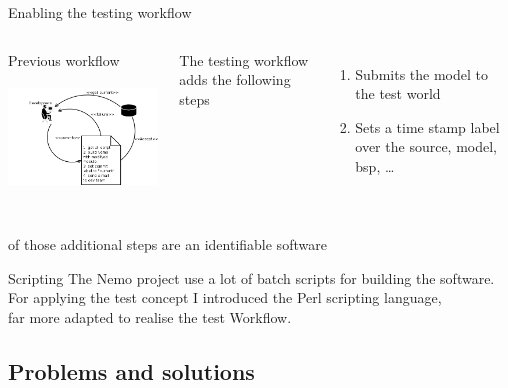 \documentclass{beamer}
\begin{document}
\begin{frame}{Enabling the testing workflow}
  \begin{columns}

    \begin{block}{Previous workflow}
      \includegraphics[height=3.5cm]{img/workflow.png}
    \end{block}

    The testing workflow adds the following steps
    \begin{enumerate}
    \item<1-> Submits the model to the test world
    \item<2-> Sets a time stamp label over the source, model, bsp, \ldots
    \end{enumerate}
  \end{columns}
\begin{description}
 \item<3->[The results] of those additional steps are an identifiable software
\end{description}
\end{frame}

\begin{frame}{Scripting}
The Nemo project use a lot of batch scripts for building the software.\\
For applying the test concept I introduced the \alert{Perl} scripting language,\\
far more adapted to realise the test Workflow.

\end{frame}

\subsection{Problems and solutions}
\end{document}
